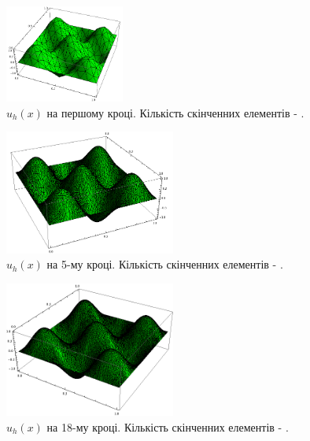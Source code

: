 \begin{frame}[allowframebreaks]
		\begin{figure}[H]
			\centering
		    \includegraphics[width=0.35\textwidth]{problem1/my/solutions/1}
		    \caption{$u_h(x)$ на першому кроці. Кількість скінченних елементів - .}
		    \label{fig:p1_solution1}
		\end{figure}
		\begin{figure}[H]
			\centering
		    \includegraphics[width=0.5\textwidth]{problem1/my/solutions/5}
		    \caption{$u_h(x)$ на 5-му кроці. Кількість скінченних елементів - .}
		    \label{fig:p1_solution5}
		\end{figure}
		\begin{figure}[H]
			\centering
		    \includegraphics[width=0.5\textwidth]{problem1/my/solutions/18}
		    \caption{$u_h(x)$ на 18-му кроці. Кількість скінченних елементів - .}
		    \label{fig:p1_solution18}
		\end{figure}

\end{frame}
